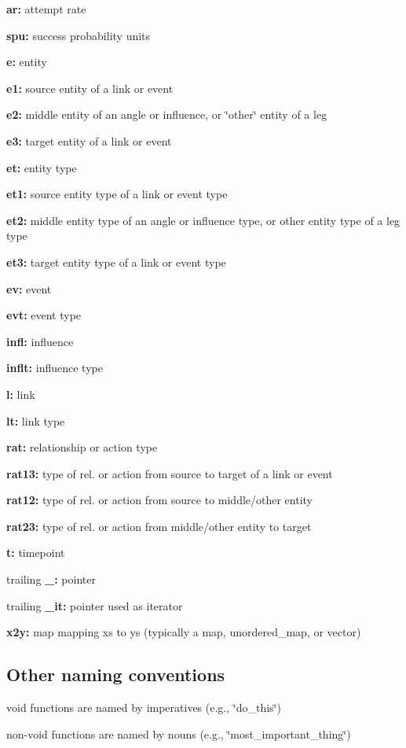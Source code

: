 \begin{DoxyItemize}
\item {\bfseries ar\+:} attempt rate
\item {\bfseries spu\+:} success probability units
\item {\bfseries e\+:} entity
\item {\bfseries e1\+:} source entity of a link or event
\item {\bfseries e2\+:} middle entity of an angle or influence, or \char`\"{}other\char`\"{} entity of a leg
\item {\bfseries e3\+:} target entity of a link or event
\item {\bfseries et\+:} entity type
\item {\bfseries et1\+:} source entity type of a link or event type
\item {\bfseries et2\+:} middle entity type of an angle or influence type, or other entity type of a leg type
\item {\bfseries et3\+:} target entity type of a link or event type
\item {\bfseries ev\+:} event
\item {\bfseries evt\+:} event type
\item {\bfseries infl\+:} influence
\item {\bfseries inflt\+:} influence type
\item {\bfseries l\+:} link
\item {\bfseries lt\+:} link type
\item {\bfseries rat\+:} relationship or action type
\item {\bfseries rat13\+:} type of rel. or action from source to target of a link or event
\item {\bfseries rat12\+:} type of rel. or action from source to middle/other entity
\item {\bfseries rat23\+:} type of rel. or action from middle/other entity to target
\item {\bfseries t\+:} timepoint
\item trailing {\bfseries \+\_\+\+:} pointer
\item trailing {\bfseries \+\_\+it\+:} pointer used as iterator
\item {\bfseries x2y\+:} map mapping xs to ys (typically a map, unordered\+\_\+map, or vector)
\end{DoxyItemize}

\subsection*{Other naming conventions }


\begin{DoxyItemize}
\item void functions are named by imperatives (e.\+g., \char`\"{}do\+\_\+this\char`\"{})
\item non-\/void functions are named by nouns (e.\+g., \char`\"{}most\+\_\+important\+\_\+thing\char`\"{}) 
\end{DoxyItemize}